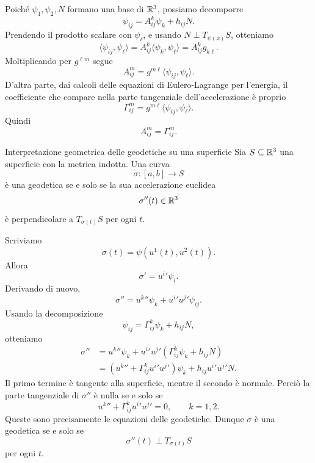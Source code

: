 \documentclass[a4paper]{article}
\begin{document}
\begin{snippetproof}{}
Poiché \(\psi_1,\psi_2,N\) formano una base di \(\mathbb{R}^3\), possiamo decomporre
\[
    \psi_{ij}
    =
    A^k_{ij}\psi_k+h_{ij}N.
\]
Prendendo il prodotto scalare con \(\psi_\ell\), e usando \(N\perp T_{\psi(x)}S\), otteniamo
\[
    \langle\psi_{ij},\psi_\ell\rangle
    =
    A^k_{ij}\langle\psi_k,\psi_\ell\rangle
    =
    A^k_{ij}g_{k\ell}.
\]
Moltiplicando per \(g^{\ell m}\) segue
\[
    A^m_{ij}
    =
    g^{m\ell}\langle\psi_{ij},\psi_\ell\rangle.
\]
D'altra parte, dai calcoli delle equazioni di Eulero-Lagrange per l'energia, il coefficiente che compare nella parte tangenziale dell'accelerazione è proprio
\[
    \Gamma^m_{ij}
    =
    g^{m\ell}\langle\psi_{ij},\psi_\ell\rangle.
\]
Quindi
\[
    A^m_{ij}=\Gamma^m_{ij}.
\]
\end{snippetproof}

\begin{snippettheorem}{Interpretazione geometrica delle geodetiche su una superficie}
Sia \(S\subseteq\mathbb{R}^3\) una superficie con la metrica indotta. Una curva
\[
    \sigma:[a,b]\longrightarrow S
\]
è una geodetica se e solo se la sua accelerazione euclidea
\[
    \sigma''(t)\in\mathbb{R}^3
\]
è perpendicolare a \(T_{\sigma(t)}S\) per ogni \(t\).
\end{snippettheorem}

\begin{snippetproof}{}
Scriviamo
\[
    \sigma(t)=\psi(u^1(t),u^2(t)).
\]
Allora
\[
    \sigma'
    =
    u^i{}'\psi_i.
\]
Derivando di nuovo,
\[
    \sigma''
    =
    u^k{}''\psi_k
    +
    u^i{}'u^j{}'\psi_{ij}.
\]
Usando la decomposizione
\[
    \psi_{ij}
    =
    \Gamma^k_{ij}\psi_k+h_{ij}N,
\]
otteniamo
\begin{align*}
    \sigma''
    &=
    u^k{}''\psi_k
    +
    u^i{}'u^j{}'
    \left(
        \Gamma^k_{ij}\psi_k+h_{ij}N
    \right)\\
    &=
    \left(
        u^k{}''
        +
        \Gamma^k_{ij}u^i{}'u^j{}'
    \right)\psi_k
    +
    h_{ij}u^i{}'u^j{}'N.
\end{align*}
Il primo termine è tangente alla superficie, mentre il secondo è normale. Perciò la parte tangenziale di \(\sigma''\) è nulla se e solo se
\[
    u^k{}''
    +
    \Gamma^k_{ij}u^i{}'u^j{}'
    =
    0,
    \qquad
    k=1,2.
\]
Queste sono precisamente le equazioni delle geodetiche. Dunque \(\sigma\) è una geodetica se e solo se
\[
    \sigma''(t)\perp T_{\sigma(t)}S
\]
per ogni \(t\).
\end{snippetproof}
\end{document}
